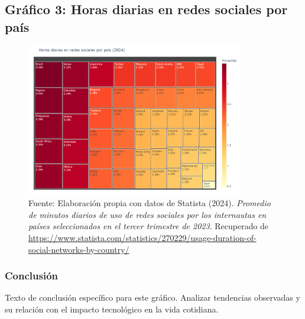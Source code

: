 \documentclass[12pt, a4paper]{article}
\begin{document}
\subsection*{Gráfico 3: Horas diarias en redes sociales por país}
\begin{figure}[H]
    \centering
    \includegraphics[width=0.85\textwidth]{images/graph1_JG.png}
    \caption{
        Fuente: Elaboración propia con datos de Statista (2024). 
        \textit{Promedio de minutos diarios de uso de redes sociales por los internautas en países seleccionados en el tercer trimestre de 2023}. 
        Recuperado de \url{https://www.statista.com/statistics/270229/usage-duration-of-social-networks-by-country/}
    }
\end{figure}


\subsubsection*{Conclusión}
Texto de conclusión específico para este gráfico. Analizar tendencias observadas y su relación con el impacto tecnológico en la vida cotidiana.
\end{document}
